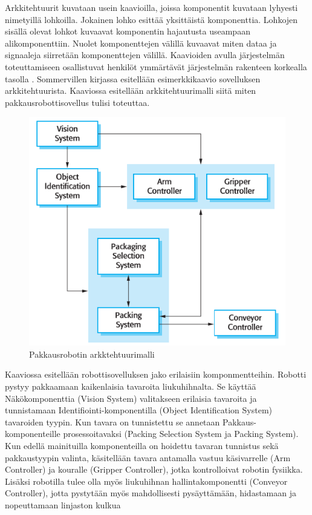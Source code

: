 \documentclass[utf8]{gradu3}
\begin{document}
Arkkitehtuurit kuvataan usein kaavioilla, joissa komponentit kuvataan lyhyesti nimetyillä lohkoilla. Jokainen lohko esittää yksittäistä komponenttia. Lohkojen sisällä olevat lohkot kuvaavat komponentin hajautusta useampaan alikomponenttiin. Nuolet komponenttejen välillä kuvaavat miten dataa ja signaaleja siirretään komponenttejen välillä. Kaavioiden avulla järjestelmän toteuttamiseen osallistuvat henkilöt ymmärtävät järjestelmän rakenteen korkealla tasolla \parencite[s. 150]{Sommerville}. Sommervillen kirjassa esitellään esimerkkikaavio sovelluksen arkkitehtuurista. Kaaviossa esitellään arkkitehtuurimalli siitä miten pakkausrobottisovellus tulisi toteuttaa.

\begin{figure}[h]
\centering
\includegraphics[scale=0.85]{architecture.png}
\caption{Pakkausrobotin arkktehtuurimalli \parencite[s.149]{Sommerville}}
\end{figure}

Kaaviossa esitellään robottisovelluksen jako erilaisiin komponmentteihin. Robotti pystyy pakkaamaan kaikenlaisia tavaroita liukuhihnalta. Se käyttää Näkökomponenttia (Vision System) valitakseen erilaisia tavaroita ja tunnistamaan Identifiointi-komponentilla (Object Identification System) tavaroiden tyypin. Kun tavara on tunnistettu se annetaan Pakkaus-komponenteille prosessoitavaksi (Packing Selection System ja Packing System). Kun edellä mainituilla komponenteilla on hoidettu tavaran tunnistus sekä pakkaustyypin valinta, käsitellään tavara antamalla vastuu käsivarrelle (Arm Controller) ja kouralle (Gripper Controller), jotka kontrolloivat robotin fysiikka. Lisäksi robotilla tulee olla myös liukuhihnan hallintakomponentti (Conveyor Controller), jotta pystytään myös mahdollisesti pysäyttämään, hidastamaan ja nopeuttamaan linjaston kulkua \parencite[s.148]{Sommerville}
\end{document}
